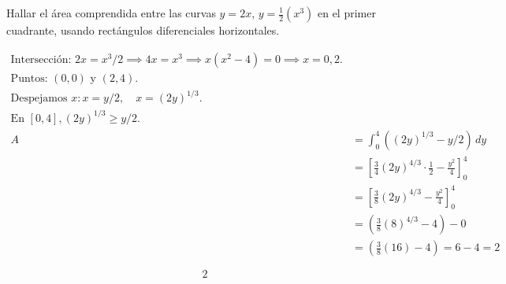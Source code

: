 Hallar el área comprendida entre las curvas $y=2x$, $y=\frac{1}{2}(x^3)$ en el primer cuadrante, usando rectángulos diferenciales horizontales.

\nopagebreak
\begin{align*}
\text{Intersección: } 2x = x^3/2 \implies 4x = x^3 \implies x(x^2-4)=0 \implies x=0, 2. \\
\text{Puntos: } (0,0) \text{ y } (2,4). \\
\text{Despejamos } x: x = y/2, \quad x = (2y)^{1/3}. \\
\text{En } [0,4], (2y)^{1/3} \ge y/2. \\
A &= \int_{0}^{4} ((2y)^{1/3} - y/2) \, dy \\
&= \left[ \frac{3}{4}(2y)^{4/3} \cdot \frac{1}{2} - \frac{y^2}{4} \right]_{0}^{4} \\
&= \left[ \frac{3}{8}(2y)^{4/3} - \frac{y^2}{4} \right]_{0}^{4} \\
&= (\frac{3}{8}(8)^{4/3} - 4) - 0 \\
&= (\frac{3}{8}(16) - 4) = 6 - 4 = 2
\end{align*}

\[
\boxed{\displaystyle 2}
\]
